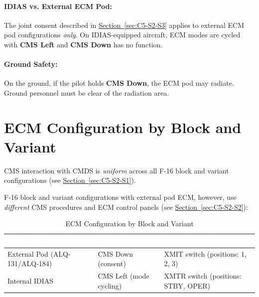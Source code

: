 \documentclass[11pt, a4paper, twoside]{report}
\newcommand{\secref}[1]{\hyperref[#1]{Section~\ref*{#1}}}
\begin{document}
\paragraph{IDIAS vs. External ECM Pod:}

The joint consent described in \secref{sec:C5-S2-S3} applies to external ECM pod configurations \textit{only}. On IDIAS-equipped aircraft, ECM modes are cycled with \textbf{CMS Left} and \textbf{CMS Down} has no function.

\paragraph{Ground Safety:}

On the ground, if the pilot holds \textbf{CMS Down}, the ECM pod may radiate. Ground personnel must be clear of the radiation area.

\section{ECM Configuration by Block and Variant}
\label{sec:C5-S3}

CMS interaction with CMDS is \textit{uniform} across all F-16 block and variant configurations (see \secref{sec:C5-S2-S1}).

F-16 block and variant configurations with external pod ECM, however, use \textit{different} CMS procedures and ECM control panels (see \secref{sec:C5-S2-S2}):

\begin{table}[H]
\centering
\caption{ECM Configuration by Block and Variant}
\label{tab:C5-S3-ecm-config-summary}
\small
\renewcommand{\arraystretch}{1.25}
\begin{tabular}{|>{\raggedright\arraybackslash}p{3.6cm}|>{\raggedright\arraybackslash}p{3.6cm}|>{\raggedright\arraybackslash}p{4.6cm}|}
\hline
\rowcolor{headerblue}
\textcolor{white}{\textbf{ECM Configuration}} & \textcolor{white}{\textbf{CMS Direction}} & \textcolor{white}{\textbf{Panel Control}} \\
\hline
External Pod (ALQ-131/ALQ-184) & CMS Down (consent) & XMIT switch (positions: 1, 2, 3) \\
\hline
Internal IDIAS & CMS Left (mode cycling) & XMTR switch (positions: STBY, OPER) \\
\hline
\end{tabular}
\end{table}
\end{document}
